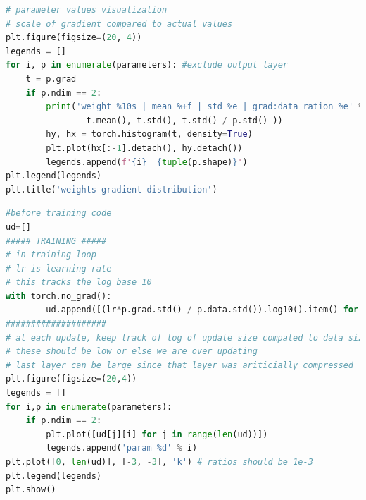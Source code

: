 \documentclass{article}
\begin{document}
\begin{lstlisting}[language=Python, caption={Scale between gradients and values of parameters}, label={code:grad-scale-graph}]
# parameter values visualization
# scale of gradient compared to actual values
plt.figure(figsize=(20, 4))
legends = []
for i, p in enumerate(parameters): #exclude output layer
    t = p.grad 
    if p.ndim == 2:
        print('weight %10s | mean %+f | std %e | grad:data ration %e' % (tuple(p.shape), 
                t.mean(), t.std(), t.std() / p.std() ))
        hy, hx = torch.histogram(t, density=True)
        plt.plot(hx[:-1].detach(), hy.detach())
        legends.append(f'{i}  {tuple(p.shape)}')
plt.legend(legends)
plt.title('weights gradient distribution')
\end{lstlisting}

\begin{lstlisting}[language=Python, caption={Size of update scaled by size of the parameter}, label={code:update-graph}]
#before training code
ud=[]
##### TRAINING #####
# in training loop
# lr is learning rate
# this tracks the log base 10
with torch.no_grad():
        ud.append([(lr*p.grad.std() / p.data.std()).log10().item() for p in parameters])
####################
# at each update, keep track of log of update size compated to data size
# these should be low or else we are over updating
# last layer can be large since that layer was ariticially compressed
plt.figure(figsize=(20,4))
legends = []
for i,p in enumerate(parameters):
    if p.ndim == 2:
        plt.plot([ud[j][i] for j in range(len(ud))])
        legends.append('param %d' % i)
plt.plot([0, len(ud)], [-3, -3], 'k') # ratios should be 1e-3
plt.legend(legends)
plt.show()
\end{lstlisting}
\end{document}

